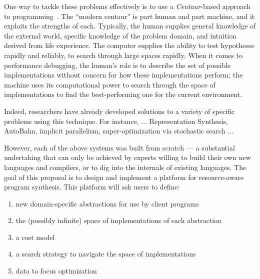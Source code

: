 
One way to tackle these problems effectively is to use a \emph{Centaur}-based 
approach to programming~\cite{centaur}.  The ``modern centaur'' is 
part human and part machine, and it exploits the strengths of each.
Typically, the human supplies general knowledge of the external world,
specific knowledge of the problem domain, and intuition derived from life experience.  The
computer supplies the ability to test hypotheses rapidly and reliably,
to search through large spaces rapidly.
When it comes to performance debugging, the human's role is to describe
the set of possible implementations without concern for how these implementations
perform; the machine uses its computational power to search through the space of 
implementations to find the best-performing one for the current environment.

Indeed, researchers have already developed solutions to a variety of specific problems
using this technique.  For instance, ... Representation Synthesis, AutoBahn, implicit
parallelism, super-optimization via stochastic search ...

However, each of the above systems was built from scratch --- a substantial undertaking
that can only be achieved by experts willing to build their own new languages and
compilers, or to dig into the internals of existing languages.  The goal of
this proposal is to design and implement a platform for resource-aware program
synthesis.  This platform will ask users to define:

\begin{enumerate}
\item new domain-specific abstractions for use by client programs
\item the (possibly infinite) space of implementations of each abstraction
\item a cost model
\item a search strategy to navigate the space of implementations
\item data to focus optimization
\end{enumerate}

